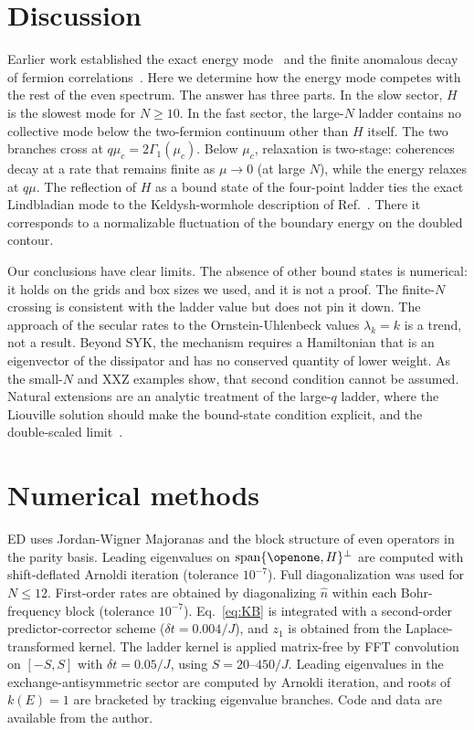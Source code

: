 \documentclass[aps,pre,twocolumn,superscriptaddress,amsmath,amssymb,10pt]{revtex4-2}
\begin{document}
\section{Discussion}

Earlier work established the exact energy mode~\cite{Garcia2026} and the finite anomalous decay of fermion correlations~\cite{Garcia2023,Kulkarni2022}. Here we determine how the energy mode competes with the rest of the even spectrum. The answer has three parts. In the slow sector, $H$ is the slowest mode for $N\ge10$. In the fast sector, the large-$N$ ladder contains no collective mode below the two-fermion continuum other than $H$ itself. The two branches cross at $q\mu_c=2\Gamma_1(\mu_c)$. Below $\mu_c$, relaxation is two-stage: coherences decay at a rate that remains finite as $\mu\to0$ (at large $N$), while the energy relaxes at $q\mu$. The reflection of $H$ as a bound state of the four-point ladder ties the exact Lindbladian mode to the Keldysh-wormhole description of Ref.~\cite{Garcia2023}. There it corresponds to a normalizable fluctuation of the boundary energy on the doubled contour.

Our conclusions have clear limits. The absence of other bound states is numerical: it holds on the grids and box sizes we used, and it is not a proof. The finite-$N$ crossing is consistent with the ladder value but does not pin it down. The approach of the secular rates to the Ornstein-Uhlenbeck values $\lambda_k=k$ is a trend, not a result. Beyond SYK, the mechanism requires a Hamiltonian that is an eigenvector of the dissipator and has no conserved quantity of lower weight. As the small-$N$ and XXZ examples show, that second condition cannot be assumed. Natural extensions are an analytic treatment of the large-$q$ ladder, where the Liouville solution should make the bound-state condition explicit, and the double-scaled limit~\cite{Berkooz2019,Lin2022}.

\section*{Numerical methods}

ED uses Jordan-Wigner Majoranas and the block structure of even operators in the parity basis. Leading eigenvalues on $\mathrm{span}\{\openone,H\}^\perp$ are computed with shift-deflated Arnoldi iteration (tolerance $10^{-7}$). Full diagonalization was used for $N\le12$. First-order rates are obtained by diagonalizing $\hat n$ within each Bohr-frequency block (tolerance $10^{-7}$). Eq.~\eqref{eq:KB} is integrated with a second-order predictor-corrector scheme ($\delta t=0.004/J$), and $z_1$ is obtained from the Laplace-transformed kernel. The ladder kernel is applied matrix-free by FFT convolution on $[-S,S]$ with $\delta t=0.05/J$, using $S=20$--$450/J$. Leading eigenvalues in the exchange-antisymmetric sector are computed by Arnoldi iteration, and roots of $k(E)=1$ are bracketed by tracking eigenvalue branches. Code and data are available from the author.
\end{document}
